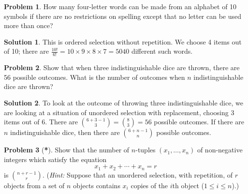 \documentclass{article}
\numberwithin{equation}{section}
\theoremstyle{plain}
\theoremstyle{definition}
\newtheorem{problem}{Problem}
\newtheorem*{solution*}{Solution}
\begin{document}
\begin{problem}
	How many four-letter words can be made from an alphabet of 10 symbols if there are no restrictions on spelling except that no letter can be used more than once? 
\end{problem}

\begin{solution*}
	This is ordered selection without repetition. We choose 4 items out of 10; there are $\frac{10!}{6!} = 10 \times 9 \times 8 \times 7 = \boxed{5040}$ different such words. 
\end{solution*}

\begin{problem}
	Show that when three indistinguishable dice are thrown, there are 56 possible outcomes. What is the number of outcomes when $n$ indistinguishable dice are thrown?
\end{problem}

\begin{solution*}
	To look at the outcome of throwing three indistinguishable dice, we are looking at a situation of unordered selection with replacement, choosing 3 items out of 6. There are $\binom{6+3-1}{3} = \binom{8}{3} = 56$ possible outcomes. If there are $n$ indistinguishable dice, then there are $\binom{6+n-1}{n}$ possible outcomes. 
\end{solution*}

\begin{problem}[\textbf{*}]
	Show that the number of $n$-tuples $(x_1, \ldots, x_n)$ of non-negative integers which satisfy the equation 
	\[
	x_1 + x_2 + \cdots + x_n = r
	\]
	is $\binom{n+r-1}{r}$. (\emph{Hint:} Suppose that an unordered selection, with repetition, of $r$ objects from a set of $n$ objects contains $x_i$ copies of the $i$th object ($1 \leq i \leq n$).)
\end{problem}
\end{document}
